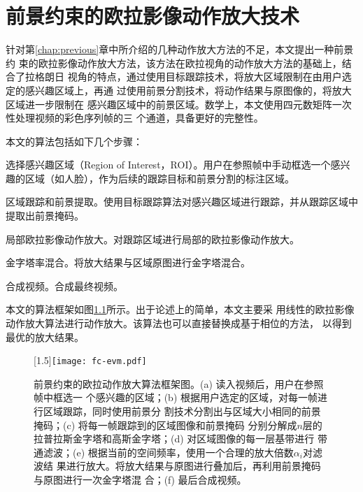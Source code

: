 \chapter{前景约束的欧拉影像动作放大技术}
\label{chap:fc-evm}

针对第\ref{chap:previous}章中所介绍的几种动作放大方法的不足，本文提出一种前景约
束的欧拉影像动作放大方法，该方法在欧拉视角的动作放大方法的基础上，结合了拉格朗日
视角的特点，通过使用目标跟踪技术，将放大区域限制在由用户选定的感兴趣区域上，再通
过使用前景分割技术，将动作结果与原图像的，将放大区域进一步限制在
感兴趣区域中的前景区域。数学上，本文使用四元数矩阵一次性处理视频的彩色序列帧的三
个通道，具备更好的完整性。

本文的算法包括如下几个步骤：

\begin{compactenum}
\item 选择感兴趣区域（Region of Interest，ROI）。用户在参照帧中手动框选一个感兴
  趣的区域（如人脸），作为后续的跟踪目标和前景分割的标注区域。
\item 区域跟踪和前景提取。使用目标跟踪算法对感兴趣区域进行跟踪，并从跟踪区域中提取出前景掩码。
\item 局部欧拉影像动作放大。对跟踪区域进行局部的欧拉影像动作放大。
\item 金字塔率混合。将放大结果与区域原图进行金字塔混合。
\item 合成视频。合成最终视频。
\end{compactenum}

本文的算法框架如图\ref{fig:fc-evm-frameworks}所示。出于论述上的简单，本文主要采
用线性的欧拉影像动作放大算法进行动作放大。该算法也可以直接替换成基于相位的方法，
以得到最优的放大结果。

\begin{landscape}
  \begin{figure}[htbp]
  \centering
  \scalebox{1.5}[1.5]{\texttt{[image: fc-evm.pdf]}}
  \caption{前景约束的欧拉动作放大算法框架图。(a) 读入视频后，用户在参照帧中框选一
    个感兴趣的区域；(b) 根据用户选定的区域，对每一帧进行区域跟踪，同时使用前景分
    割技术分割出与区域大小相同的前景掩码；(c) 将每一帧跟踪到的区域图像和前景掩码
    分别分解成$n$层的拉普拉斯金字塔和高斯金字塔；(d) 对区域图像的每一层基带进行
    带通滤波；(e) 根据当前的空间频率，使用一个合理的放大倍数$\alpha_i$对滤波结
    果进行放大。将放大结果与原图进行叠加后，再利用前景掩码与原图进行一次金字塔混
    合；(f) 最后合成视频。}
  \label{fig:fc-evm-frameworks}
\end{figure}
\end{landscape}

